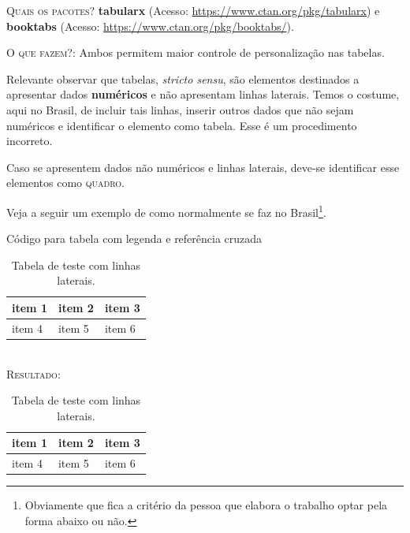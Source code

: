 \documentclass[a4paper,12pt,oneside,openright,extrafontsizes,openbib]{memoir}
\begin{document}
{\textsc{Quais os pacotes?} \textbf{tabularx} (Acesso: \url{https://www.ctan.org/pkg/tabularx}) e \textbf{booktabs} (Acesso: \url{https://www.ctan.org/pkg/booktabs/}).

\textsc{O que fazem?}: Ambos permitem maior controle de personalização nas tabelas. 

Relevante observar que tabelas, \textit{stricto sensu}, são elementos destinados a apresentar dados \textbf{numéricos} e não apresentam linhas laterais. Temos o costume, aqui no Brasil, de incluir tais linhas, inserir outros dados que não sejam numéricos e identificar o elemento como tabela. Esse é um procedimento incorreto. 

Caso se apresentem dados não numéricos e linhas laterais, deve-se identificar esse elementos como \textsc{quadro}.

Veja a seguir um exemplo de como normalmente se faz no Brasil\footnote{Obviamente que fica a critério da pessoa que elabora o trabalho optar pela forma abaixo ou não.}.
\ \\

\begin{codex}{Código para tabela com legenda e referência cruzada}
\begin{table}[h!]
	\begin{center}
	\begin{tabularx}{0.8\textwidth} { 
	| >{\centering\arraybackslash}X 
	| >{\centering\arraybackslash}X 
	| >{\centering\arraybackslash}X | }
	\hline
	item 1 & item 2 & item 3 \\
	\hline
	item 4  & item 5  & item 6  \\
	\hline
	\end{tabularx}
	\caption{Tabela de teste com linhas laterais.}
	\label{table:1}
	\end{center}
	\end{table}
\end{codex}
\ \\

\textsc{Resultado:}

\begin{table}[h!]
	\begin{center}
		\begin{tabularx}{0.8\textwidth} { 
				| >{\centering\arraybackslash}X 
				| >{\centering\arraybackslash}X 
				| >{\centering\arraybackslash}X | }
			\hline
			item 1 & item 2 & item 3 \\
			\hline
			item 4  & item 5  & item 6  \\
			\hline
		\end{tabularx}
		\caption{Tabela de teste com linhas laterais.}
		\label{table:1}
	\end{center}
\end{table}

}
\end{document}
